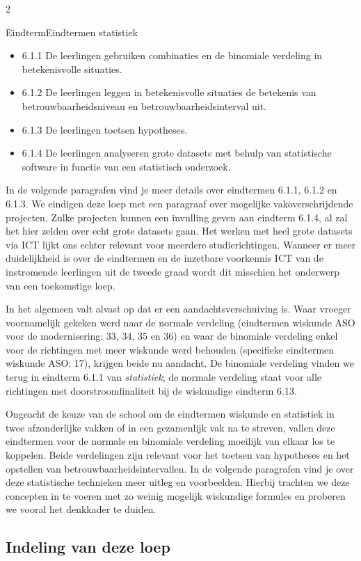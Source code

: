 \begin{multicols}{2}
\begin{kader}{Eindterm}{Eindtermen statistiek}
\begin{itemize}
        \item 6.1.1 De leerlingen gebruiken combinaties en de binomiale verdeling in betekenisvolle situaties.
        \item 6.1.2 De leerlingen leggen in betekenisvolle situaties de betekenis van betrouwbaarheidsniveau en betrouwbaarheidsinterval uit.
        \item 6.1.3 De leerlingen toetsen hypotheses.
        \item 6.1.4 De leerlingen analyseren grote datasets met behulp van statistische software in functie van een statistisch onderzoek.
    \end{itemize}
\end{kader}
    In de volgende paragrafen vind je meer details over eindtermen 6.1.1, 6.1.2 en 6.1.3. We eindigen deze loep met een paragraaf over mogelijke vakoverschrijdende projecten. Zulke projecten kunnen een invulling geven aan eindterm 6.1.4, al zal het hier zelden over echt grote datasets gaan. Het werken met heel grote datasets via ICT lijkt ons echter relevant voor meerdere studierichtingen.  Wanneer er meer duidelijkheid is over de eindtermen en de inzetbare voorkennis ICT van de instromende leerlingen uit de tweede graad wordt dit misschien het onderwerp van een toekomstige loep.

    In het algemeen valt alvast op dat er een aandachtsverschuiving is. Waar vroeger voornamelijk gekeken werd naar de normale verdeling (eindtermen wiskunde ASO voor de modernisering: 33, 34, 35 en 36) en waar de binomiale verdeling enkel voor de richtingen met meer wiskunde werd behouden (specifieke eindtermen wiskunde ASO: 17), krijgen beide nu aandacht. De binomiale verdeling vinden we terug in eindterm 6.1.1 van \emph{statistiek}; de normale verdeling staat voor alle richtingen met doorstroomfinaliteit bij de wiskundige eindterm 6.13. 
    
    Ongeacht de keuze van de school om de eindtermen wiskunde en statistiek in twee afzonderlijke vakken of in een gezamenlijk vak na te streven, vallen deze eindtermen voor de normale en binomiale verdeling moeilijk van elkaar los te koppelen. Beide verdelingen zijn relevant voor het toetsen van hypotheses en het opstellen van betrouwbaarheidsintervallen. In de volgende paragrafen vind je over deze statistische technieken meer uitleg en voorbeelden. Hierbij trachten we deze concepten in te voeren met zo weinig mogelijk wiskundige formules en proberen we vooral het denkkader te duiden. 

\subsection*{Indeling van deze loep }


\end{multicols}

